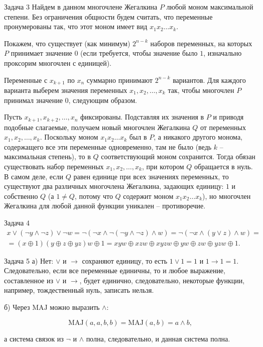 \documentclass{article}
\begin{document}
	\begin{section}{Задача 3}
		Найдем в данном многочлене Жегалкина $P$ любой моном максимальной степени. Без ограничения общности будем считать, что переменные пронумерованы так, что этот моном имеет вид $x_1 x_2 \dots x_k$.

		Покажем, что существует (как минимум) $2^{n-k}$ наборов переменных, на которых $P$ принимает значение $0$ (если требуется, чтобы значение было $1$, изначально проксорим многочлен с единицей).

		Переменные с $x_{k+1}$ по $x_n$ суммарно принимают $2^{n-k}$ вариантов. Для каждого варианта выберем значения переменных $x_1, x_2, \dots, x_k$ так, чтобы многочлен $P$ принимал значение $0$, следующим образом.

		Пусть $x_{k+1}, x_{k+2}, \dots, x_n$ фиксированы. Подставляя их значения в $P$ и приводя подобные слагаемые, получаем новый многочлен Жегалкина $Q$ от переменных $x_1, x_2, \dots, x_k$. Поскольку моном $x_1 x_2 \dots x_k$ был в $P$, а никакого другого монома, содержащего все эти переменные одновременно, там не было (ведь $k$ -- максимальная степень), то в $Q$ соответствующий моном сохранится. Тогда обязан существовать набор переменных $x_1, x_2, \dots, x_k$, при котором $Q$ обращается в нуль. В самом деле, если $Q$ равен единице при всех значениях переменных, то существуют два различных многочлена Жегалкина, задающих единицу: $1$ и собственно $Q$ (а $1 \ne Q$, потому что $Q$ содержит моном $x_1 x_2 \dots x_k$), но многочлен Жегалкина для любой данной функции уникален -- противоречие.
	\end{section}

	\begin{section}{Задача 4}
		\begin{multline*}
			x \lor (\neg y \land \neg z) \lor \neg w = \neg (\neg x \land \neg (\neg y \land \neg z) \land w) = \neg (\neg x \land (y \lor z) \land w) = \\
			= (x \oplus 1)(y \oplus z \oplus yz)w \oplus 1 = xyw \oplus xzw \oplus xyzw \oplus yw \oplus zw \oplus yzw \oplus 1.
		\end{multline*}
	\end{section}

	\begin{section}{Задача 5}
		а) Нет: $\lor$ и $\rightarrow$ сохраняют единицу, то есть $1 \lor 1 = 1$ и $1 \rightarrow 1 = 1$. Следовательно, если все переменные единичны, то и любое выражение, составленное из $\lor$ и $\rightarrow$, будет единично, следовательно, некоторые функции, например, тождественный нуль, записать нельзя.

		б) Через $\mathrm{MAJ}$ можно выразить $\land$:

		\begin{equation*}
			\mathrm{MAJ}(a, a, b, b) = \mathrm{MAJ}(a, b) = a \land b,
		\end{equation*}

		а система связок из $\neg$ и $\land$ полна, следовательно, и данная система полна.
	\end{section}
\end{document}
